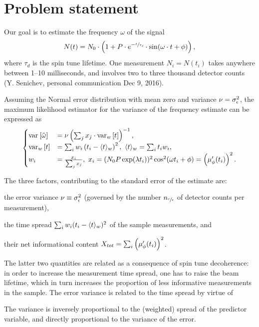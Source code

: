 \documentclass{article}
\begin{document}
	
\section*{Problem statement}

Our goal is to estimate the frequency $\omega$ of the signal
\begin{equation}
	N(t) = N_0\cdot\bkt{1 + P\cdot e^{-\sfrac{t}{\tau_d}}\cdot\sin(\omega\cdot t + \phi)},
\end{equation}
where $\tau_d$ is the spin tune lifetime. One measurement $N_i = N(t_i)$ takes anywhere between 1--10 milliseconds, and involves two to three thousand detector counts (Y. Senichev, personal communication Dec 9, 2016).

Assuming the Normal error distribution with mean zero and variance $\nu = \SD{\meas}^2$, the maximum likelihood estimator for the variance of the frequency estimate can be expressed as
\begin{equation}
\begin{cases}
\var{\hat\omega} &= \nu\bkt{\sum_j x_j\cdot \var[w]{t}}^{-1}, \\
\var[w]{t} &= \sum_i w_i \bkt{t_i - \avg{t}_w}^2,~ \avg{t}_w = \sum_i t_i w_i, \\
w_i &= \frac{x_i}{\sum_j x_j},~ x_i = (N_0P\exp(\lambda t_i))^2\cos^2(\omega t_i + \phi) = \bkt{\mupp}^2.
\end{cases}	
\end{equation}

The three factors, contributing to the standard error of the estimate are:
\begin{inparaenum}
	\item the error variance $\nu \equiv \SD{\meas}^2$ (governed by the number $n_{\sfrac{c}{\epsilon}}$ of detector counts per measurement), 
	\item the time spread $\sum_i w_i (t_i - \langle t\rangle_w)^2$ of the sample measurements, and
	\item their net informational content $X_{tot} = \sum_i \bkt{\mupp}^2$.
\end{inparaenum}

The latter two quantities are related as a consequence of spin tune decoherence: in order to increase the measurement time spread, one has to raise the beam lifetime, which in turn increases the proportion of less informative measurements in the sample. The error variance is related to the time spread by virtue of 


The variance is inversely proportional to the (weighted) spread of the predictor variable, and directly proportional to the variance of the error. 
\end{document}
